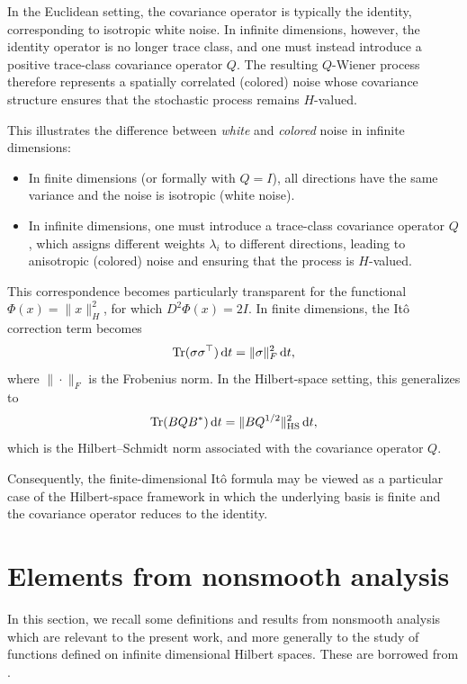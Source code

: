 \documentclass[12pt]{amsart}
\newcommand{\D}[1]{\mbox{\rm #1}}
\newcommand{\dd}{\D{d}}
\numberwithin{equation}{section}
\begin{document}
In the Euclidean setting, the covariance operator is typically the identity, corresponding to isotropic white noise. In infinite dimensions, however, the identity operator is no longer trace class, and one must instead introduce a positive trace-class covariance operator $Q$. The resulting $Q$-Wiener process therefore represents a spatially correlated (colored) noise whose covariance structure ensures that the stochastic process remains $H$-valued.

This illustrates the difference between \textit{white} and \textit{colored} noise in infinite dimensions:
\begin{itemize}
    \item In finite dimensions (or formally with $Q = I$), all directions have the same variance and the noise is isotropic (white noise).
    \item In infinite dimensions, one must introduce a trace-class covariance operator $Q$, which assigns different weights $\lambda_i$ to different directions, leading to anisotropic (colored) noise and ensuring that the process is $H$-valued.
\end{itemize}

This correspondence becomes particularly transparent for the functional $\Phi(x)=\|x\|_H^2$, for which $D^2\Phi(x)=2I$.  
In finite dimensions, the It\^o correction term becomes
\[
    \mathrm{Tr}(\sigma\sigma^\top)\,\dd t = \|\sigma\|_F^2\,\dd t,
\]
where $\|\cdot\|_F$ is the Frobenius norm. In the Hilbert-space setting, this generalizes to
\[
    \mathrm{Tr}(BQB^*)\,\dd t = \|BQ^{1/2}\|_{\mathrm{HS}}^2\,\dd t,
\]
which is  the Hilbert--Schmidt norm associated with the covariance operator $Q$.

Consequently, the finite-dimensional It\^o formula may be viewed as a particular case of the Hilbert-space framework in which the underlying basis is finite and the covariance operator reduces to the identity.



%
%


\section{Elements from nonsmooth analysis}\label{app:nonsmooth}

In this section, we recall some definitions and results from nonsmooth analysis which are relevant to the present work, and more generally to the study of functions defined on infinite dimensional Hilbert spaces. 
These are borrowed from \cite[Chapter 2]{clarke1990optimization}.
\end{document}
